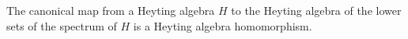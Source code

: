 \begin{theorem}
    The canonical map from a Heyting algebra $H$ to the Heyting algebra of the lower sets
    of the spectrum of $H$ is a Heyting algebra homomorphism.
\end{theorem}